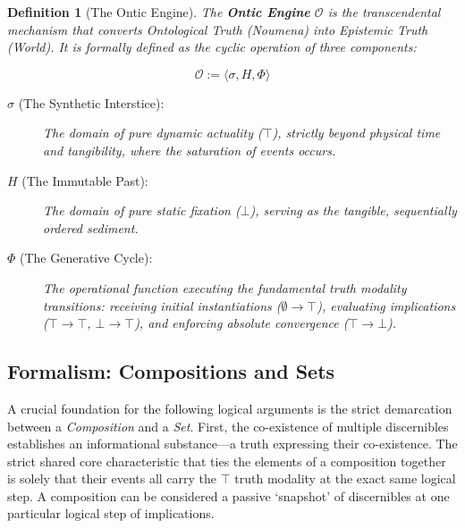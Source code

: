 \documentclass[11pt, a4paper]{article}
\theoremstyle{formalism}
\newtheorem{formalism}{Definition}
\begin{document}
\begin{formalism}[The Ontic Engine]

    The \textbf{Ontic Engine} $\mathcal{O}$ is the transcendental mechanism that
    converts Ontological Truth (Noumena) into Epistemic Truth (World). It is
    formally defined as the cyclic operation of three components:

    \begin{equation}
        \mathcal{O} := \langle \sigma, H, \Phi \rangle
    \end{equation}

    \begin{description}
        \item[$\sigma$ (The Synthetic Interstice):] The domain of pure dynamic
        actuality ($\top$), strictly beyond physical time and tangibility, where
        the saturation of events occurs.
        
        \item[$H$ (The Immutable Past):] The domain of pure static fixation
        ($\bot$), serving as the tangible, sequentially ordered sediment.
        
        \item[$\Phi$ (The Generative Cycle):] The operational function executing
        the fundamental truth modality transitions: receiving initial instantiations
        ($\emptyset \rightarrow \top$), evaluating implications ($\top \rightarrow \top$,
        $\bot \rightarrow \top$), and enforcing absolute convergence ($\top \rightarrow \bot$).
    \end{description}

\end{formalism}

\subsection{Formalism: Compositions and Sets}

A crucial foundation for the following logical arguments is the strict demarcation
between a \textit{Composition} and a \textit{Set}. First, the co-existence of
multiple discernibles establishes an informational substance---a truth expressing
their co-existence. The strict shared core characteristic that ties the elements
of a composition together is solely that their events all carry the $\top$ truth
modality at the exact same logical step. A composition can be considered a passive
`snapshot' of discernibles at one particular logical step of implications. 
\end{document}
